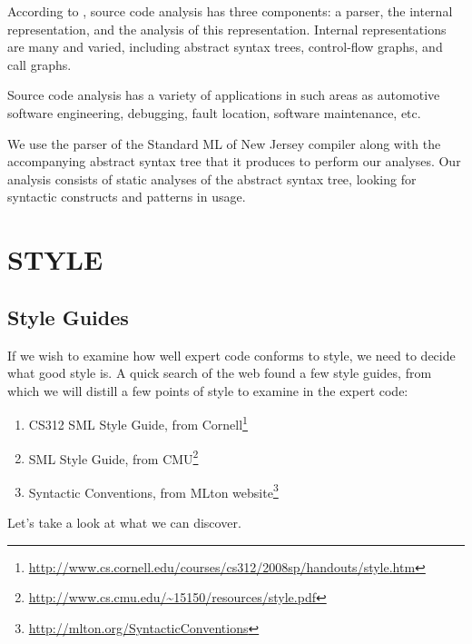 \documentclass[12pt,abstracton]{scrartcl}
\begin{document}
According to \cite{Bin07}, source code analysis has three components: a parser,
the internal representation, and the analysis of this representation.
Internal representations are many and varied, including abstract syntax trees,
control-flow graphs, and call graphs.

Source code analysis has a variety of applications in such areas as
automotive software engineering, debugging, fault location, software maintenance,
etc.\cite{Bin07}

We use the parser of the Standard ML of New Jersey compiler along with the accompanying
abstract syntax tree that it produces to perform our analyses. Our analysis
consists of static analyses of the abstract syntax tree, looking for
syntactic constructs and patterns in usage.
\section{STYLE}\label{sec:style}
\subsection{Style Guides}\label{subsec:guide}
If we wish to examine how well expert code conforms to style, we need to decide
what good style is. A quick search of the web found a few style guides, from which
we will distill a few points of style to examine in the expert code:
\begin{enumerate}
\item CS312 SML Style Guide, from Cornell\footnote{\url{http://www.cs.cornell.edu/courses/cs312/2008sp/handouts/style.htm}}
\item SML Style Guide, from CMU\footnote{\url{http://www.cs.cmu.edu/~15150/resources/style.pdf}}
\item Syntactic Conventions, from MLton website\footnote{\url{http://mlton.org/SyntacticConventions}}
\end{enumerate}
Let's take a look at what we can discover.
\end{document}
